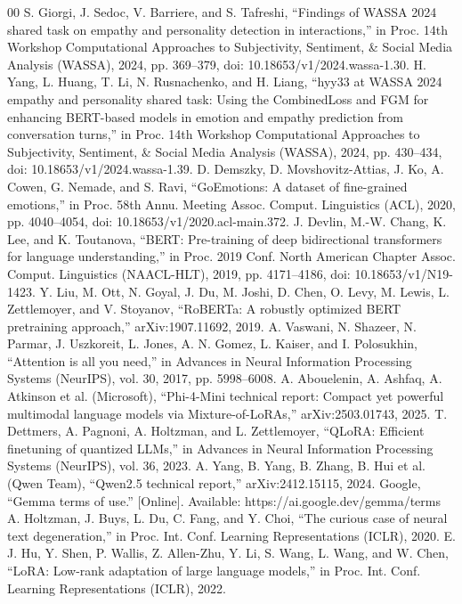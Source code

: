 \documentclass[conference]{IEEEtran}
\begin{document}
\begin{thebibliography}{00}
 S. Giorgi, J. Sedoc, V. Barriere, and S. Tafreshi, ``Findings of WASSA 2024 shared task on empathy and personality detection in interactions,'' in Proc. 14th Workshop Computational Approaches to Subjectivity, Sentiment, \& Social Media Analysis (WASSA), 2024, pp. 369--379, doi: 10.18653/v1/2024.wassa-1.30.
 H. Yang, L. Huang, T. Li, N. Rusnachenko, and H. Liang, ``hyy33 at WASSA 2024 empathy and personality shared task: Using the CombinedLoss and FGM for enhancing BERT-based models in emotion and empathy prediction from conversation turns,'' in Proc. 14th Workshop Computational Approaches to Subjectivity, Sentiment, \& Social Media Analysis (WASSA), 2024, pp. 430--434, doi: 10.18653/v1/2024.wassa-1.39.
 D. Demszky, D. Movshovitz-Attias, J. Ko, A. Cowen, G. Nemade, and S. Ravi, ``GoEmotions: A dataset of fine-grained emotions,'' in Proc. 58th Annu. Meeting Assoc. Comput. Linguistics (ACL), 2020, pp. 4040--4054, doi: 10.18653/v1/2020.acl-main.372.
 J. Devlin, M.-W. Chang, K. Lee, and K. Toutanova, ``BERT: Pre-training of deep bidirectional transformers for language understanding,'' in Proc. 2019 Conf. North American Chapter Assoc. Comput. Linguistics (NAACL-HLT), 2019, pp. 4171--4186, doi: 10.18653/v1/N19-1423.
 Y. Liu, M. Ott, N. Goyal, J. Du, M. Joshi, D. Chen, O. Levy, M. Lewis, L. Zettlemoyer, and V. Stoyanov, ``RoBERTa: A robustly optimized BERT pretraining approach,'' arXiv:1907.11692, 2019.
 A. Vaswani, N. Shazeer, N. Parmar, J. Uszkoreit, L. Jones, A. N. Gomez, L. Kaiser, and I. Polosukhin, ``Attention is all you need,'' in Advances in Neural Information Processing Systems (NeurIPS), vol. 30, 2017, pp. 5998--6008.
 A. Abouelenin, A. Ashfaq, A. Atkinson et al. (Microsoft), ``Phi-4-Mini technical report: Compact yet powerful multimodal language models via Mixture-of-LoRAs,'' arXiv:2503.01743, 2025.
 T. Dettmers, A. Pagnoni, A. Holtzman, and L. Zettlemoyer, ``QLoRA: Efficient finetuning of quantized LLMs,'' in Advances in Neural Information Processing Systems (NeurIPS), vol. 36, 2023.
 A. Yang, B. Yang, B. Zhang, B. Hui et al. (Qwen Team), ``Qwen2.5 technical report,'' arXiv:2412.15115, 2024.
 Google, ``Gemma terms of use.'' [Online]. Available: https://ai.google.dev/gemma/terms
 A. Holtzman, J. Buys, L. Du, C. Fang, and Y. Choi, ``The curious case of neural text degeneration,'' in Proc. Int. Conf. Learning Representations (ICLR), 2020.
 E. J. Hu, Y. Shen, P. Wallis, Z. Allen-Zhu, Y. Li, S. Wang, L. Wang, and W. Chen, ``LoRA: Low-rank adaptation of large language models,'' in Proc. Int. Conf. Learning Representations (ICLR), 2022.

\end{thebibliography}
\end{document}
